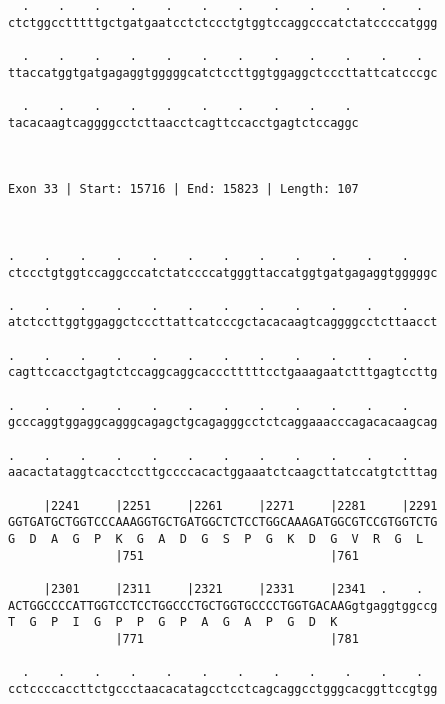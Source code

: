 \documentclass{article}
\begin{document}
\begin{Verbatim}
  .    .    .    .    .    .    .    .    .    .    .    .  
ctctggcctttttgctgatgaatcctctccctgtggtccaggcccatctatccccatggg
                                                            
  .    .    .    .    .    .    .    .    .    .    .    .  
ttaccatggtgatgagaggtgggggcatctccttggtggaggctcccttattcatcccgc
                                                            
  .    .    .    .    .    .    .    .    .    . 
tacacaagtcaggggcctcttaacctcagttccacctgagtctccaggc
                                                 
                                                 
 
Exon 33 | Start: 15716 | End: 15823 | Length: 107



.    .    .    .    .    .    .    .    .    .    .    .    
ctccctgtggtccaggcccatctatccccatgggttaccatggtgatgagaggtgggggc
                                                            
.    .    .    .    .    .    .    .    .    .    .    .    
atctccttggtggaggctcccttattcatcccgctacacaagtcaggggcctcttaacct
                                                            
.    .    .    .    .    .    .    .    .    .    .    .    
cagttccacctgagtctccaggcaggcaccctttttcctgaaagaatctttgagtccttg
                                                            
.    .    .    .    .    .    .    .    .    .    .    .    
gcccaggtggaggcagggcagagctgcagagggcctctcaggaaacccagacacaagcag
                                                            
.    .    .    .    .    .    .    .    .    .    .    .    
aacactataggtcacctccttgccccacactggaaatctcaagcttatccatgtctttag
                                                            
     |2241     |2251     |2261     |2271     |2281     |2291
GGTGATGCTGGTCCCAAAGGTGCTGATGGCTCTCCTGGCAAAGATGGCGTCCGTGGTCTG
G  D  A  G  P  K  G  A  D  G  S  P  G  K  D  G  V  R  G  L  
               |751                          |761           
  
     |2301     |2311     |2321     |2331     |2341  .    .  
ACTGGCCCCATTGGTCCTCCTGGCCCTGCTGGTGCCCCTGGTGACAAGgtgaggtggccg
T  G  P  I  G  P  P  G  P  A  G  A  P  G  D  K              
               |771                          |781           
  
  .    .    .    .    .    .    .    .    .    .    .    .  
cctccccaccttctgccctaacacatagcctcctcagcaggcctgggcacggttccgtgg
                                                            

\end{Verbatim}
\end{document}
